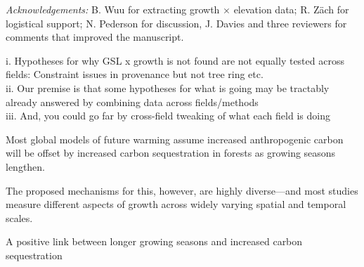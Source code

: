 \documentclass[11pt]{article}
\begin{document}


\emph{Acknowledgements:} B. Wuu for extracting growth $\times$ elevation data; R. Z{\"a}ch for logistical support; N. Pederson for discussion, J. Davies and three reviewers for comments that improved the manuscript. 

\iffalse

i. Hypotheses for why GSL x growth is not found are not equally tested across fields: Constraint issues in provenance but not tree ring etc.\\
ii. Our premise is that some hypotheses for what is going may be tractably already answered by combining data across fields/methods\\
iii. And, you could go far by cross-field tweaking of what each field is doing

Most global models of future warming assume increased anthropogenic carbon will be offset by increased carbon sequestration in forests as growing seasons lengthen.

The proposed mechanisms for this, however, are highly diverse---and most studies measure different aspects of growth across widely varying spatial and temporal scales. 

A positive link between longer growing seasons and increased carbon sequestration 
\end{document}
